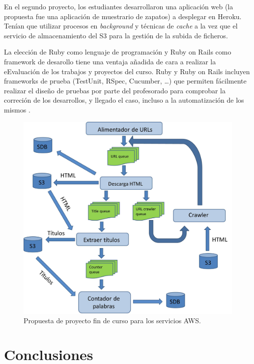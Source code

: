 \documentclass[conference]{IEEEtran}
\begin{document}
En el segundo proyecto, los estudiantes desarrollaron una aplicación web (la propuesta fue una aplicación de muestrario de zapatos) a desplegar en Heroku.
Tenían que utilizar procesos en \textit{background} y técnicas de \textit{cache} a la vez que el servicio de almacenamiento del S3 para la gestión de la subida de ficheros.



La elección de Ruby como lenguaje de programación y Ruby on Rails como framework de desarollo tiene una ventaja añadida de cara a realizar la eEvaluación de los trabajos y proyectos del curso.
Ruby y Ruby on Rails incluyen frameworks de prueba (TestUnit, RSpec, Cucumber, \dots \cite{Rappin:2010}) que permiten fácilmente realizar el diseño de pruebas por parte del profesorado para comprobar la correción de los desarrollos,
y llegado el caso, incluso a la automatización de los mismos \cite{Jenkins:2011}.


\begin{figure}[!t]
\centering
\includegraphics[width=\columnwidth]{Homework_sqs_sdb.jpeg}
\caption{Propuesta de proyecto fin de curso para los servicios AWS.}
\label{fig:trabajo}
\end{figure}


\section{Conclusiones \label{sec:conclusiones}}
\end{document}

